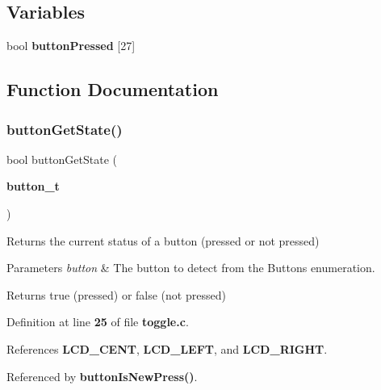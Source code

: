 \subsection*{Variables}
\begin{DoxyCompactItemize}
\item 
bool \textbf{ button\+Pressed} [27]
\end{DoxyCompactItemize}


\subsection{Function Documentation}
\mbox{\label{toggle_8c_ad2b7c969a01f85d57bdca0bc7f5cff81}} 
\subsubsection{button\+Get\+State()}
{\footnotesize\ttfamily bool button\+Get\+State (\begin{DoxyParamCaption}\item[{\textbf{ button\+\_\+t}}]{ }\end{DoxyParamCaption})}



Returns the current status of a button (pressed or not pressed) 


\begin{DoxyParams}{Parameters}
{\em button} & The button to detect from the Buttons enumeration.\\
\hline
\end{DoxyParams}
\begin{DoxyReturn}{Returns}
true (pressed) or false (not pressed) 
\end{DoxyReturn}


Definition at line \textbf{ 25} of file \textbf{ toggle.\+c}.



References \textbf{ L\+C\+D\+\_\+\+C\+E\+NT}, \textbf{ L\+C\+D\+\_\+\+L\+E\+FT}, and \textbf{ L\+C\+D\+\_\+\+R\+I\+G\+HT}.



Referenced by \textbf{ button\+Is\+New\+Press()}.


